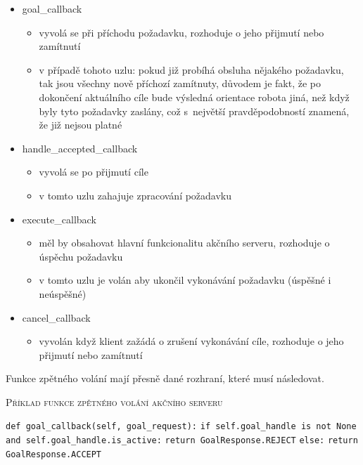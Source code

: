 \begin{itemize}[leftmargin=*]
	\item{goal\_callback}
	\vspace*{-0.5em}
	\begin{itemize}
		\item{vyvolá se při příchodu požadavku, rozhoduje o jeho přijmutí nebo zamítnutí}
		\item{v případě tohoto uzlu: pokud již probíhá obsluha nějakého požadavku, tak jsou všechny nově příchozí zamítnuty, důvodem je fakt, že po dokončení aktuálního cíle bude výsledná orientace robota jiná, než když byly tyto požadavky zaslány, což s~největší pravděpodobností znamená, že již nejsou platné}
	\end{itemize}
	\item{handle\_accepted\_callback}
	\vspace*{-0.5em}
	\begin{itemize}
		\item{vyvolá se po přijmutí cíle}
		\item{v tomto uzlu zahajuje zpracování požadavku}
	\end{itemize}
	\item{execute\_callback}
	\vspace*{-0.5em}
	\begin{itemize}
		\item{měl by obsahovat hlavní funkcionalitu akčního serveru, rozhoduje o úspěchu požadavku}
		\item{v tomto uzlu je volán aby ukončil vykonávání požadavku (úspěšné i neúspěšné)}
	\end{itemize}
	\item{cancel\_callback}
	\vspace*{-0.5em}
	\begin{itemize}
		\item{vyvolán když klient zažádá o zrušení vykonávání cíle, rozhoduje o jeho přijmutí nebo zamítnutí}
	\end{itemize}
\end{itemize} 

Funkce zpětného volání mají přesně dané rozhraní, které musí následovat.
\begin{algorithm}[h!]
	\label{}
	\caption{\textsc{Příklad funkce zpětného volání akčního serveru}}
	
	\DontPrintSemicolon
	\SetAlgoNoLine
	\SetNlSty{}{}{:}
	\SetNlSkip{-1.1em}
	
	\BlankLine \Indp\Indpp
	
	\texttt{def goal\_callback(self, goal\_request):}\;
	\Indp\Indp
	\texttt{if self.goal\_handle is not None and self.goal\_handle.is\_active:}\;
	\Indp\Indp
	\texttt{return GoalResponse.REJECT}\;
	\Indm\Indm
	\texttt{else:}\;
	\Indp\Indp
	\texttt{return GoalResponse.ACCEPT}\;

\end{algorithm}

